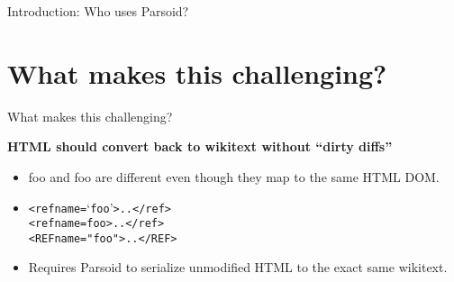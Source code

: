 \documentclass[t,xcolor=dvipsnames]{beamer}
\newcommand{\WT}[2][\small]{\color{blue} #1{\tt #2}}
\newenvironment{wikitext}[1][\small]%
{\begin{alltt}\bgroup\color{blue}#1}%
{\egroup\end{alltt}}
\begin{document}
\begin{frame}{Introduction: Who uses Parsoid?}
\end{frame}

\section{What makes this challenging?}

\begin{frame}{What makes this challenging?}

{\bf HTML should convert back to wikitext without ``dirty diffs''}
\begin{itemize}
  \item {\WT* foo} and {\WT *foo} are different even though they map to the same HTML DOM.
  \item
  \begin{wikitext}
  <ref name=`foo'>..</ref>\\
  <ref name = foo>..</ref>\\
  <REF name="foo">..</REF>
  \end{wikitext}
  \item Requires Parsoid to serialize unmodified HTML to the exact same wikitext.
\end{itemize}

\end{frame}
\end{document}
